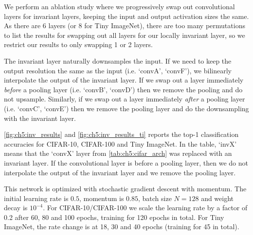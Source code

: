 We perform an ablation study where we progressively swap out convolutional
layers for invariant layers, keeping the input and output activation sizes the
same. As there are 6 layers (or 8 for Tiny ImageNet), there are too many
permutations to list the results for swapping out all layers for our locally
invariant layer, so we restrict our results to only swapping 1 or 2 layers. 

The invariant layer naturally downsamples the input. If we need to keep the
output resolution the same as the input (i.e. `convA', `convF'), we bilinearly
interpolate the output of the invariant layer. If we swap out a layer
immediately \emph{before} a pooling layer (i.e. `convB', `convD') then we remove
the pooling and do not upsample.  Similarly, if we swap out a layer immediately
\emph{after} a pooling layer (i.e.  `convC', `convE') then we remove the pooling
layer and do the downsampling with the invariant layer.

\autoref{fig:ch5:inv_results} and \autoref{fig:ch5:inv_results_ti} reports the
top-1 classification accuracies for CIFAR-10, CIFAR-100 and Tiny ImageNet. In
the table, `invX' means that the `convX' layer from \autoref{tab:ch5:cifar_arch}
was replaced with an invariant layer. If the convolutional layer is before a
pooling layer, then we do not interpolate the output of the invariant layer and
we remove the pooling layer. 

This network is optimized with stochastic gradient descent with momentum. The
initial learning rate is $0.5$, momentum is $0.85$, batch size $N=128$ and
weight decay is $10^{-4}$. For CIFAR-10/CIFAR-100 we scale the learning rate by
a factor of 0.2 after 60, 80 and 100 epochs, training for 120 epochs in total.
For Tiny ImageNet, the rate change is at 18, 30 and 40 epochs (training for 45 in total).

